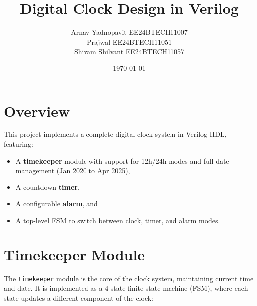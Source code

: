 \documentclass[11pt]{article}
\title{\textbf{Digital Clock Design in Verilog}}
\author{Arnav Yadnopavit EE24BTECH11007\\Prajwal EE24BTECH11051\\Shivam Shilvant EE24BTECH11057}
\date{\today}
\begin{document}
\maketitle

\section{Overview}
This project implements a complete digital clock system in Verilog HDL, featuring:
\begin{itemize}
  \item A \textbf{timekeeper} module with support for 12h/24h modes and full date management (Jan 2020 to Apr 2025),
  \item A countdown \textbf{timer},
  \item A configurable \textbf{alarm}, and
  \item A top-level FSM to switch between clock, timer, and alarm modes.
\end{itemize}

\section{Timekeeper Module}
The \texttt{timekeeper} module is the core of the clock system, maintaining current time and date. It is implemented as a 4-state finite state machine (FSM), where each state updates a different component of the clock:
\end{document}
